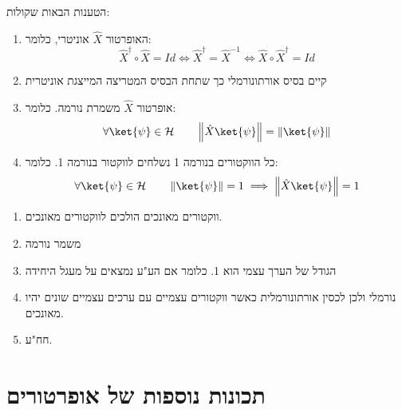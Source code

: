 \documentclass{tstextbook}
\begin{document}
\begin{proposition}
הטענות הבאות שקולות:

  \begin{enumerate}
    \item האופרטור \(\hat{X}\) אוניטרי, כלומר: 
$$\hat{X}^{\dagger} \circ \hat{X} = Id \iff \hat{X}^{\dagger} =\hat{X}^{-1} \iff \hat{X}\circ \hat{X}^{\dagger} = Id$$


    \item קיים בסיס אורתונורמלי כך שתחת הבסיס המטריצה המייצגת אוניטרית 


    \item אופרטור \(\hat{X}\) משמרת נורמה. כלומר: 
$$\forall \ket{\psi}  \in \mathcal{H}\qquad \left\lVert  \hat{X}\ket{\psi}  \right\rVert =\left\lVert  \ket{\psi}   \right\rVert  $$


    \item כל הווקטורים בנורמה 1 נשלחים לווקטור בנורמה 1. כלומר: 
$$\forall \ket{\psi}  \in \mathcal{H}\qquad \left\lVert  \ket{\psi}   \right\rVert =1\implies \left\lVert  \hat{X}\ket{\psi}   \right\rVert =1  $$


  \end{enumerate}
\end{proposition}
\begin{proposition}
  \begin{enumerate}
    \item ווקטורים מאונכים הולכים לווקטורים מאונכים. 


    \item משמר נורמה 


    \item הגודל של הערך עצמי הוא 1. כלומר אם הע"ע נמצאים על מעגל היחידה 


    \item נורמלי ולכן לכסין אורתונורמלית כאשר ווקטורים עצמיים עם ערכים עצמיים שונים יהיו מאונכים. 


    \item חח"ע. 


  \end{enumerate}
\end{proposition}
\section{תכונות נוספות של אופרטורים}
\end{document}
